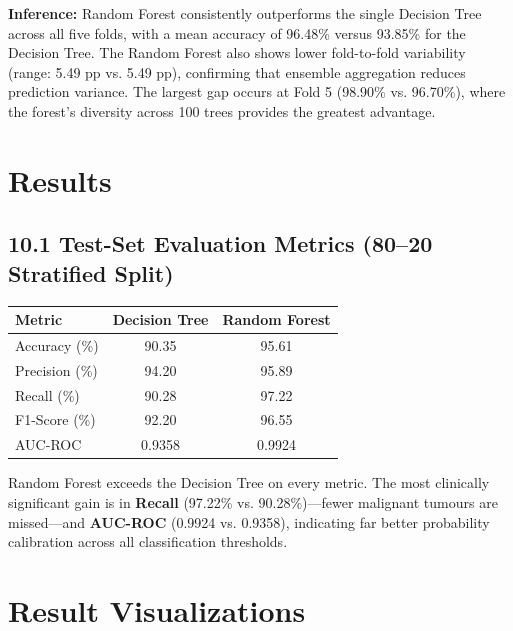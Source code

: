 \documentclass[12pt,a4paper]{article}
\begin{document}
\textbf{Inference:}
Random Forest consistently outperforms the single Decision Tree across all five folds, with a mean
accuracy of 96.48\% versus 93.85\% for the Decision Tree. The Random Forest also shows lower
fold-to-fold variability (range: 5.49 pp vs. 5.49 pp), confirming that ensemble aggregation reduces
prediction variance. The largest gap occurs at Fold 5 (98.90\% vs. 96.70\%), where the forest's
diversity across 100 trees provides the greatest advantage.

\section{Results}

\subsection*{10.1 Test-Set Evaluation Metrics (80--20 Stratified Split)}

\begin{center}
\begin{tabular}{lcc}
\toprule
\textbf{Metric}   & \textbf{Decision Tree} & \textbf{Random Forest} \\
\midrule
Accuracy (\%)     & 90.35 & 95.61 \\
Precision (\%)    & 94.20 & 95.89 \\
Recall (\%)       & 90.28 & 97.22 \\
F1-Score (\%)     & 92.20 & 96.55 \\
AUC-ROC           & 0.9358 & 0.9924 \\
\bottomrule
\end{tabular}
\end{center}

\vspace{4pt}
Random Forest exceeds the Decision Tree on every metric. The most clinically significant gain is in
\textbf{Recall} (97.22\% vs. 90.28\%)---fewer malignant tumours are missed---and
\textbf{AUC-ROC} (0.9924 vs. 0.9358), indicating far better probability calibration across all
classification thresholds.

\section{Result Visualizations}
\end{document}
